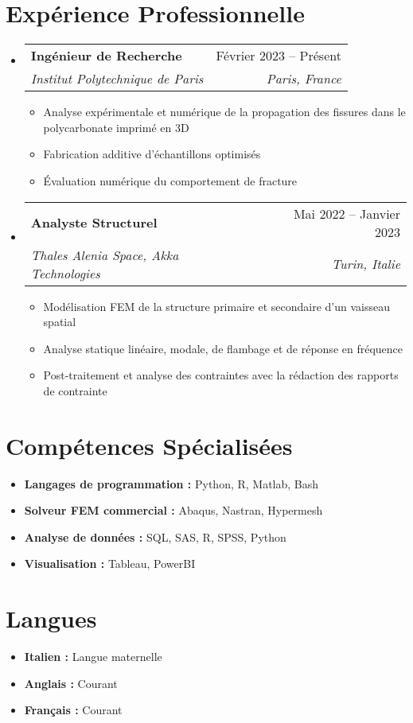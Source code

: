 \documentclass[letterpaper,11pt]{article}
\makeatletter
\newcommand{\resumeItem}[1]{
  \item{
    {#1 \vspace{-4pt}}
  }
}
\newcommand{\resumeSubheading}[4]{
  \vspace{-2pt}\item
    \begin{tabular*}{0.97\textwidth}[t]{l@{\extracolsep{\fill}}r}
      \textbf{#1} & #2 \\
      \textit{\small #3} & \textit{\small #4} \\
    \end{tabular*}\vspace{-10pt}
}
\newcommand{\resumeSubHeadingListStart}{\begin{itemize}[leftmargin=0.15in, label={}]}
\newcommand{\resumeSubHeadingListEnd}{\end{itemize}}
\newcommand{\resumeItemListStart}{\begin{itemize}}
\newcommand{\resumeItemListEnd}{\end{itemize}\vspace{-2pt}}
\makeatother
\begin{document}
\section{Expérience Professionnelle} 
\resumeSubHeadingListStart
    \resumeSubheading
      {Ingénieur de Recherche}{Février 2023 -- Présent}
      {Institut Polytechnique de Paris}{Paris, France}
      \resumeItemListStart
        \resumeItem{Analyse expérimentale et numérique de la propagation des fissures dans le polycarbonate imprimé en 3D}
        \resumeItem{Fabrication additive d'échantillons optimisés}
        \resumeItem{Évaluation numérique du comportement de fracture}
    \resumeItemListEnd

    \resumeSubheading
      {Analyste Structurel}{Mai 2022 -- Janvier 2023}
      {Thales Alenia Space, Akka Technologies}{Turin, Italie}
      \resumeItemListStart
        \resumeItem{Modélisation FEM de la structure primaire et secondaire d’un vaisseau spatial}
        \resumeItem{Analyse statique linéaire, modale, de flambage et de réponse en fréquence}
        \resumeItem{Post-traitement et analyse des contraintes avec la rédaction des rapports de contrainte}
    \resumeItemListEnd
\resumeSubHeadingListEnd

\section{Compétences Spécialisées}
\resumeSubHeadingListStart
    \resumeItem{
     \textbf{Langages de programmation :} Python, R, Matlab, Bash
    }
    \resumeItem{
     \textbf{Solveur FEM commercial :} Abaqus, Nastran, Hypermesh
    }
    \resumeItem{
     \textbf{Analyse de données :} SQL, SAS, R, SPSS, Python
    }
    \resumeItem{
     \textbf{Visualisation :} Tableau, PowerBI
    }
\resumeSubHeadingListEnd

\section{Langues}
\resumeSubHeadingListStart
    \resumeItem{
     \textbf{Italien :} Langue maternelle
    }
    \resumeItem{
     \textbf{Anglais :} Courant
    }
    \resumeItem{
     \textbf{Français :} Courant
    }
\resumeSubHeadingListEnd
\end{document}

